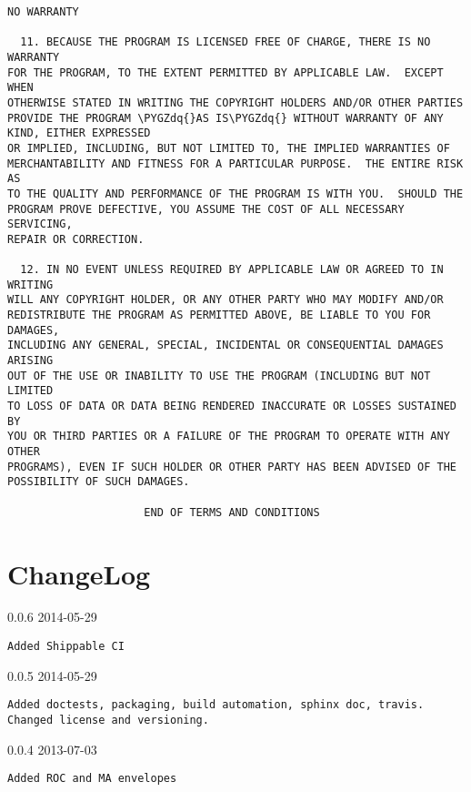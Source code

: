 \documentclass[letterpaper,10pt,english]{sphinxmanual}
\def\PYGZdq{\char`\"}
\begin{document}
\begin{Verbatim}[commandchars=\\\{\}]
                            NO WARRANTY

  11. BECAUSE THE PROGRAM IS LICENSED FREE OF CHARGE, THERE IS NO WARRANTY
FOR THE PROGRAM, TO THE EXTENT PERMITTED BY APPLICABLE LAW.  EXCEPT WHEN
OTHERWISE STATED IN WRITING THE COPYRIGHT HOLDERS AND/OR OTHER PARTIES
PROVIDE THE PROGRAM \PYGZdq{}AS IS\PYGZdq{} WITHOUT WARRANTY OF ANY KIND, EITHER EXPRESSED
OR IMPLIED, INCLUDING, BUT NOT LIMITED TO, THE IMPLIED WARRANTIES OF
MERCHANTABILITY AND FITNESS FOR A PARTICULAR PURPOSE.  THE ENTIRE RISK AS
TO THE QUALITY AND PERFORMANCE OF THE PROGRAM IS WITH YOU.  SHOULD THE
PROGRAM PROVE DEFECTIVE, YOU ASSUME THE COST OF ALL NECESSARY SERVICING,
REPAIR OR CORRECTION.

  12. IN NO EVENT UNLESS REQUIRED BY APPLICABLE LAW OR AGREED TO IN WRITING
WILL ANY COPYRIGHT HOLDER, OR ANY OTHER PARTY WHO MAY MODIFY AND/OR
REDISTRIBUTE THE PROGRAM AS PERMITTED ABOVE, BE LIABLE TO YOU FOR DAMAGES,
INCLUDING ANY GENERAL, SPECIAL, INCIDENTAL OR CONSEQUENTIAL DAMAGES ARISING
OUT OF THE USE OR INABILITY TO USE THE PROGRAM (INCLUDING BUT NOT LIMITED
TO LOSS OF DATA OR DATA BEING RENDERED INACCURATE OR LOSSES SUSTAINED BY
YOU OR THIRD PARTIES OR A FAILURE OF THE PROGRAM TO OPERATE WITH ANY OTHER
PROGRAMS), EVEN IF SUCH HOLDER OR OTHER PARTY HAS BEEN ADVISED OF THE
POSSIBILITY OF SUCH DAMAGES.

                     END OF TERMS AND CONDITIONS
\end{Verbatim}


\chapter{ChangeLog}
\label{changelog::doc}\label{changelog:changelog}
0.0.6 2014-05-29

\begin{Verbatim}[commandchars=\\\{\}]
Added Shippable CI
\end{Verbatim}

0.0.5 2014-05-29

\begin{Verbatim}[commandchars=\\\{\}]
Added doctests, packaging, build automation, sphinx doc, travis.
Changed license and versioning.
\end{Verbatim}

0.0.4 2013-07-03

\begin{Verbatim}[commandchars=\\\{\}]
Added ROC and MA envelopes
\end{Verbatim}
\end{document}
